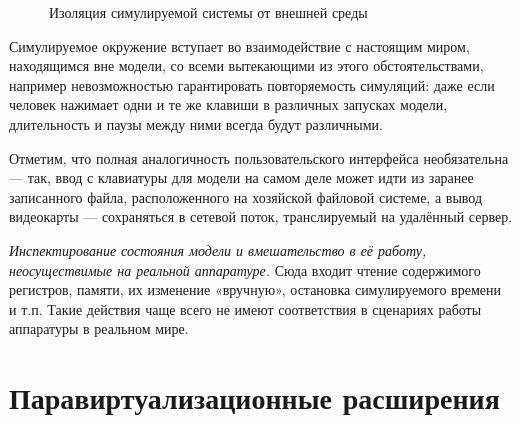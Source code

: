 \begin{enumerate*}
\begin{figure}[htp]
    \caption{Изоляция симулируемой системы от внешней среды}
    \label{fig:isolate}
\end{figure}

Симулируемое окружение вступает во взаимодействие с настоящим миром, находящимся вне модели, со всеми вытекающими из этого обстоятельствами, например невозможностью гарантировать повторяемость симуляций: даже если человек нажимает одни и те же клавиши в различных запусках модели, длительность и паузы между ними всегда будут различными.

Отметим, что полная аналогичность пользовательского интерфейса необязательна --- так, ввод с клавиатуры для модели на самом деле может идти из заранее записанного файла, расположенного на хозяйской файловой системе, а вывод видеокарты --- сохраняться в сетевой поток, транслируемый на удалённый сервер.

\item \textit{Инспектирование состояния модели и вмешательство в её работу, неосуществимые на реальной аппаратуре.} Сюда входит чтение содержимого регистров, памяти, их изменение «вручную», остановка симулируемого времени и т.п. Такие действия чаще всего не имеют соответствия в сценариях работы аппаратуры в реальном мире.
\end{enumerate*}

\section{Паравиртуализационные расширения}

